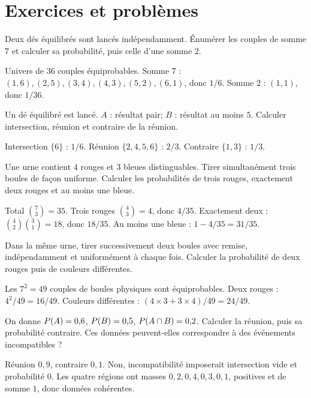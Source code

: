 \section{Exercices et problèmes}
\label{t11s-c20-e01}
Deux dés équilibrés sont lancés indépendamment. Énumérer les couples de somme $7$ et calculer sa probabilité, puis celle d’une somme $2$.
\begin{corrige}\label{sol-t11s-c20-e01}
Univers de $36$ couples équiprobables. Somme $7$ : $(1,6),(2,5),(3,4),(4,3),(5,2),(6,1)$, donc $1/6$. Somme $2$ : $(1,1)$, donc $1/36$.
\end{corrige}
\exo[Union]\label{t11s-c20-e02}
Un dé équilibré est lancé. $A$ : résultat pair; $B$ : résultat au moins $5$. Calculer intersection, réunion et contraire de la réunion.
\begin{corrige}\label{sol-t11s-c20-e02}
Intersection $\{6\}$ : $1/6$. Réunion $\{2,4,5,6\}$ : $2/3$. Contraire $\{1,3\}$ : $1/3$.
\end{corrige}
\exo[Urne]\label{t11s-c20-e03}
Une urne contient $4$ rouges et $3$ bleues distinguables. Tirer simultanément trois boules de façon uniforme. Calculer les probabilités de trois rouges, exactement deux rouges et au moins une bleue.
\begin{corrige}\label{sol-t11s-c20-e03}
Total $\binom73=35$. Trois rouges $\binom43=4$, donc $4/35$. Exactement deux : $\binom42\binom31=18$, donc $18/35$. Au moins une bleue : $1-4/35=31/35$.
\end{corrige}
\label{t11s-c20-e04}
Dans la même urne, tirer successivement deux boules avec remise, indépendamment et uniformément à chaque fois. Calculer la probabilité de deux rouges puis de couleurs différentes.
\begin{corrige}\label{sol-t11s-c20-e04}
Les $7^2=49$ couples de boules physiques sont équiprobables. Deux rouges : $4^2/49=16/49$. Couleurs différentes : $(4\times3+3\times4)/49=24/49$.
\end{corrige}
\label{t11s-c20-e05}
On donne $P(A)=0{,}6$, $P(B)=0{,}5$, $P(A\cap B)=0{,}2$. Calculer la réunion, puis sa probabilité contraire. Ces données peuvent-elles correspondre à des événements incompatibles ?
\begin{corrige}\label{sol-t11s-c20-e05}
Réunion $0{,}9$, contraire $0{,}1$. Non, incompatibilité imposerait intersection vide et probabilité $0$. Les quatre régions ont masses $0{,}2,0{,}4,0{,}3,0{,}1$, positives et de somme $1$, donc données cohérentes.
\end{corrige}
